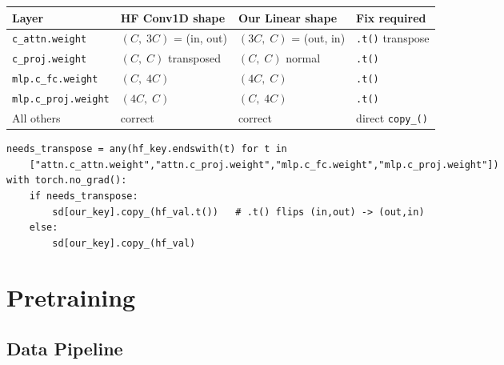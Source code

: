 \documentclass[10pt,a4paper]{article}
\newcommand{\TH}[1]{\cellcolor{BGT}\textbf{\textsf{\small #1}}}
\newcommand{\TA}{\rowcolor{BGT2}}
\begin{document}
\begin{center}
\small
\begin{tabular}{@{}L{3.4cm}C{2.8cm}C{2.8cm}L{4.4cm}@{}}
\toprule
\TH{Layer} & \TH{HF Conv1D shape} & \TH{Our Linear shape} & \TH{Fix required} \\
\midrule
\texttt{c\_attn.weight} & $(C,\;3C)$ = (in, out) & $(3C,\;C)$ = (out, in) & \texttt{.t()} transpose \\
\TA \texttt{c\_proj.weight} & $(C,\;C)$ transposed & $(C,\;C)$ normal & \texttt{.t()} \\
\texttt{mlp.c\_fc.weight} & $(C,\;4C)$ & $(4C,\;C)$ & \texttt{.t()} \\
\TA \texttt{mlp.c\_proj.weight} & $(4C,\;C)$ & $(C,\;4C)$ & \texttt{.t()} \\
All others & correct & correct & direct \texttt{copy\_()} \\
\bottomrule
\end{tabular}
\end{center}

\begin{lstlisting}[caption={Weight loader transpose check (model/gpt.py)}]
needs_transpose = any(hf_key.endswith(t) for t in
    ["attn.c_attn.weight","attn.c_proj.weight","mlp.c_fc.weight","mlp.c_proj.weight"])
with torch.no_grad():
    if needs_transpose:
        sd[our_key].copy_(hf_val.t())   # .t() flips (in,out) -> (out,in)
    else:
        sd[our_key].copy_(hf_val)
\end{lstlisting}

\section{Pretraining}

\subsection{Data Pipeline}

\begin{center}
\end{center}
\end{document}
